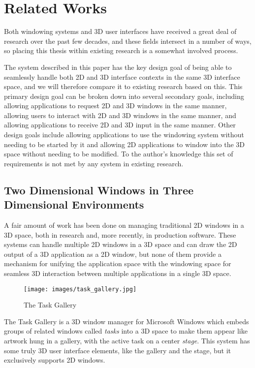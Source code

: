 \chapter{Related Works}
\label{sec:related-works}

Both windowing systems and 3D user interfaces have received a great deal of research over the past few decades, and these fields intersect in a number of ways, so placing this thesis within existing research is a somewhat involved process. 

The system described in this paper has the key design goal of being able to seamlessly handle both 2D and 3D interface contexts in the same 3D interface space, and we will therefore compare it to existing research based on this. This primary design goal can be broken down into several secondary goals, including allowing applications to request 2D and 3D windows in the same manner, allowing users to interact with 2D and 3D windows in the same manner, and allowing applications to receive 2D and 3D input in the same manner. Other design goals include allowing applications to use the windowing system without needing to be started by it and allowing 2D applications to window into the 3D space without needing to be modified. To the author's knowledge this set of requirements is not met by any system in existing research.

\section{Two Dimensional Windows in Three Dimensional Environments}
A fair amount of work has been done on managing traditional 2D windows in a 3D space, both in research and, more recently, in production software. These systems can handle multiple 2D windows in a 3D space and can draw the 2D output of a 3D application as a 2D window, but none of them provide a mechanism for unifying the application space with the windowing space for seamless 3D interaction between multiple applications in a single 3D space.

\begin{figure}[ht!]
\centering
\texttt{[image: images/task\_gallery.jpg]}
\caption{The Task Gallery \protect\cite{task_gallery}}
\end{figure}

The Task Gallery \cite{task_gallery} is a 3D window manager for Microsoft Windows which embeds groups of related windows called \emph{tasks} into a 3D space to make them appear like artwork hung in a gallery, with the active task on a center \emph{stage}. This system has some truly 3D user interface elements, like the gallery and the stage, but it exclusively supports 2D windows. 

